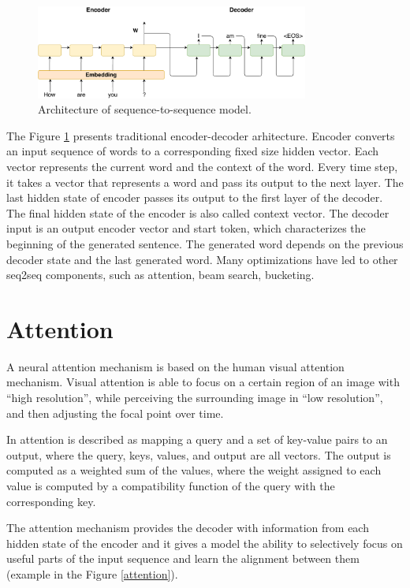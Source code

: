 \begin{figure}[hbt]
  \centering
  \includegraphics[width=0.8\textwidth]{figures/encoder_decoder.pdf}
  \caption{Architecture of sequence-to-sequence model.}
  \label{encoder_decoder}
\end{figure}

The Figure \ref{encoder_decoder} presents traditional encoder-decoder arhitecture. Encoder converts an input sequence of words to a corresponding fixed size hidden vector. Each vector represents the current word and the context of the word. Every time step, it takes a vector that represents a word and pass its output to the next layer. The last hidden state of encoder passes its output to the first layer of the decoder. The final hidden state of the encoder is also called context vector. The decoder input is an output encoder vector and start token, which characterizes the beginning of the generated sentence. The generated word depends on the previous decoder state and the last generated word. Many optimizations have led to other seq2seq components, such as attention, beam search, bucketing.

\section{Attention} \label{attention_section}
A neural attention mechanism is based on the human visual attention mechanism. Visual attention is able to focus on a certain region of an image with ``high resolution'', while perceiving the surrounding image in “low resolution”, and then adjusting the focal point over time.

In \cite{vaswani2017attention} attention is described as mapping a query and a set of key-value pairs to an output, where the query, keys, values, and output are all vectors. The output is computed as a weighted sum of the values, where the weight assigned to each value is computed by a compatibility function of the query with the corresponding key.

The attention mechanism provides the decoder with information from each hidden state of the encoder and it gives a model the ability to selectively focus on useful parts of the input sequence and learn the alignment between them (example in the Figure \ref{attention}).

